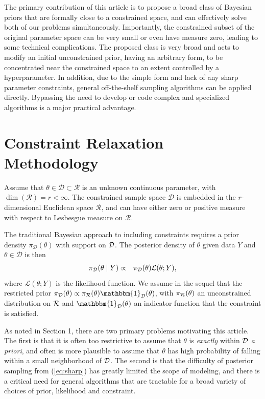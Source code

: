 \documentclass[10pt,fleqn]{article}
\DeclareMathOperator{\1}{\mathbbm{1}} \DeclareMathOperator{\bigO}{\mc O}
\begin{document}
The primary contribution of this article is to propose a broad class of Bayesian priors that are formally close to a constrained space, and can effectively solve both of our problems simultaneously.  Importantly, the constrained subset of the original parameter space can be very small or even have measure
zero, leading to some technical complications.  The proposed class is very broad and 
acts to modify an initial unconstrained prior, having an arbitrary form, to be concentrated near
the constrained space to an extent controlled by a hyperparameter.  In addition, due to the simple form and lack of any sharp parameter constraints, general off-the-shelf sampling algorithms can be applied directly.  
Bypassing the need to develop or code complex and specialized algorithms is a major practical advantage.




\section{Constraint Relaxation Methodology}

Assume that $\theta \in \mathcal{D} \subset \mathcal{R}$ is an unknown continuous parameter, 
with $\dim(\mathcal{R})=r < \infty$.  The constrained sample space $\mathcal{D}$ is 
embedded in the $r$-dimensional Euclidean space $\mathcal{R}$, and can have 
either zero or positive measure with respect to Lesbesgue measure on $\mathcal{R}$.  

The traditional Bayesian approach to including constraints requires a
prior density $\pi_\mathcal{D}(\theta)$ with support on $\mathcal{D}$. The posterior density of $\theta$
given data $Y$ and $\theta \in \mathcal{D}$ is then
\begin{eqnarray}
\pi_{\mc D}(\theta \mid  Y) %
& \propto & \pi_\mathcal{D}(\theta)\mathcal{L}(\theta; Y), \label{eq:sharp}
\end{eqnarray}
where $\mathcal{L}(\theta; Y)$ is the likelihood function. We assume in the sequel that the restricted prior $\pi_\mathcal{D}(\theta) \propto \pi_{\mc R}(\theta)\mathbbm{1}_{\mc D}(\theta)$, with $\pi_{\mathcal{R}}(\theta)$ an unconstrained distribution on ${\mathcal{R}}$ and $\mathbbm{1}_{\mc D}(\theta)$ an indicator
function that the constraint is satisfied.

As noted in Section 1, there are two primary problems motivating this article.  The first is that it is often
too restrictive to assume that $\theta$ is {\em exactly} within ${\mathcal{D}}$ {\em a priori}, and often is more plausible to assume that $\theta$ has high probability of falling within a small neighborhood of ${\mathcal{D}}$.
The second is that the difficulty of posterior sampling from (\ref{eq:sharp}) has greatly limited the scope of modeling, and there is a critical need for general algorithms that are tractable for a broad variety of choices of prior, likelihood and constraint.
\end{document}
